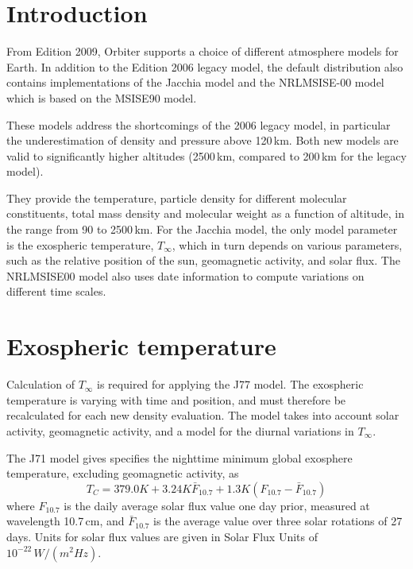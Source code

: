 \documentclass[a4paper]{article}
\begin{document}



\newcommand{\vR}[1]{\ensuremath{\vec{R}_{#1}}}
\newcommand{\nR}[1]{\ensuremath{|\vR{#1}|}}
\newcommand{\mat}[1]{\ensuremath{\mathsf{#1}}}
\newcommand{\Kelvin}{\ensuremath{\mathrm{K}}}

\maketitle

\section{Introduction}
From Edition 2009, Orbiter supports a choice of different atmosphere models for Earth. In addition to the Edition 2006 legacy model, the default distribution also contains implementations of the Jacchia model \cite{jacchia65, jacchia71, jacchia77} and the NRLMSISE-00 model which is based on the MSISE90 model.

These models address the shortcomings of the 2006 legacy model, in particular the underestimation of density and pressure above 120\,km. Both new models are valid to significantly higher altitudes (2500\,km, compared to 200\,km for the legacy model).

They provide the temperature, particle density for different molecular constituents, total mass density and molecular weight as a function of altitude, in the range from 90 to 2500\,km. For the Jacchia model, the only model parameter is the exospheric temperature, $T_\infty$, which in turn depends on various parameters, such as the relative position of the sun, geomagnetic activity, and solar flux. The NRLMSISE00 model also uses date information to compute variations on different time scales.

\section{Exospheric temperature}
Calculation of $T_\infty$ is required for applying the J77 model. The exospheric temperature is varying with time and position, and must therefore be recalculated for each new density evaluation. The model takes into account solar activity, geomagnetic activity, and a model for the diurnal variations in $T_\infty$.

The J71 model gives specifies the nighttime minimum global exosphere temperature, excluding geomagnetic activity, as
\begin{equation}
T_C = 379.0K + 3.24K \bar{F}_{10.7} + 1.3K(F_{10.7}-\bar{F}_{10.7})
\end{equation}
where $F_{10.7}$ is the daily average solar flux value one day prior, measured at wavelength 10.7\,cm, and $\bar{F}_{10.7}$ is the average value over three solar rotations of 27 days. Units for solar flux values are given in Solar Flux Units of $10^{-22}\,W/(m^2 Hz)$.
\end{document}
